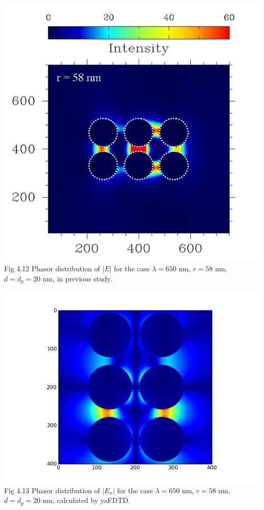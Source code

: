 \documentclass[openany]{book}
\begin{document}
\begin{center}
\includegraphics[scale=0.5]{images/r58.png}\\
Fig 4.12
Phasor distribution of $|E|$ for the case $\lambda = 650$ nm, $r = 58$ nm, $d = d_p = 20$ nm, in previous study.
\end{center}

\begin{center}
\includegraphics[scale=0.8]{images/ex-r58.png}\\
Fig 4.13
Phasor distribution of $|E_x|$ for the case $\lambda = 650$ nm, $r = 58$ nm, $d = d_p = 20$ nm, calculated by yaFDTD.
\end{center}
\end{document}
